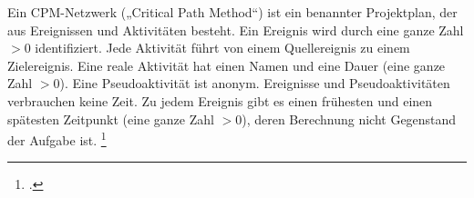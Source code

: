 \documentclass{bschlangaul-aufgabe}
\begin{document}

Ein CPM-Netzwerk („Critical Path Method“) ist ein benannter
Projektplan, der aus Ereignissen und Aktivitäten besteht. Ein Ereignis
wird durch eine ganze Zahl $> 0$ identifiziert. Jede Aktivität führt von
einem Quellereignis zu einem Zielereignis. Eine reale Aktivität hat
einen Namen und eine Dauer (eine ganze Zahl $> 0$). Eine Pseudoaktivität
ist anonym. Ereignisse und Pseudoaktivitäten verbrauchen keine Zeit. Zu
jedem Ereignis gibt es einen frühesten und einen spätesten Zeitpunkt
(eine ganze Zahl $> 0$), deren Berechnung nicht Gegenstand der Aufgabe
ist.
\footcite{examen:66116:2019:09}
\end{document}
